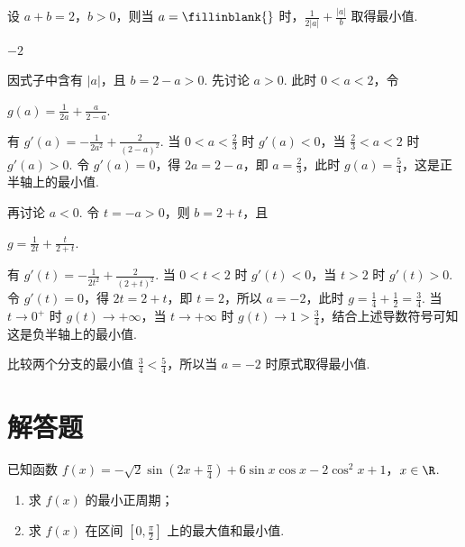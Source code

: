\begin{problem}
设 \(a + b = 2\)，\(b > 0\)，则当 \(a =\fillinblank{}\) 时，\(\frac{1}{2|a|} + \frac{|a|}{b}\) 取得最小值.
\end{problem}

\begin{answer}
\(-2\)
\end{answer}

\begin{solution}
因式子中含有 \(|a|\)，且 \(b=2-a>0\). 先讨论 \(a>0\). 此时 \(0<a<2\)，令

\(g(a)=\frac{1}{2a}+\frac{a}{2-a}\).

有 \(g'(a)=-\frac{1}{2a^2}+\frac{2}{(2-a)^2}\). 当 \(0<a<\frac{2}{3}\) 时 \(g'(a)<0\)，当 \(\frac{2}{3}<a<2\) 时 \(g'(a)>0\). 令 \(g'(a)=0\)，得 \(2a=2-a\)，即 \(a=\frac{2}{3}\)，此时 \(g(a)=\frac{5}{4}\)，这是正半轴上的最小值.

再讨论 \(a<0\). 令 \(t=-a>0\)，则 \(b=2+t\)，且

\(g=\frac{1}{2t}+\frac{t}{2+t}\).

有 \(g'(t)=-\frac{1}{2t^2}+\frac{2}{(2+t)^2}\). 当 \(0<t<2\) 时 \(g'(t)<0\)，当 \(t>2\) 时 \(g'(t)>0\). 令 \(g'(t)=0\)，得 \(2t=2+t\)，即 \(t=2\)，所以 \(a=-2\)，此时 \(g=\frac{1}{4}+\frac{1}{2}=\frac{3}{4}\). 当 \(t\to0^+\) 时 \(g(t)\to+\infty\)，当 \(t\to+\infty\) 时 \(g(t)\to1>\frac{3}{4}\)，结合上述导数符号可知这是负半轴上的最小值.

比较两个分支的最小值 \(\frac{3}{4}<\frac{5}{4}\)，所以当 \(a=-2\) 时原式取得最小值.
\end{solution}

\section{解答题}

\begin{problem}
已知函数 \(f(x) = -\sqrt{2} \sin \left(2x + \frac{\pi}{4}\right) + 6 \sin x \cos x - 2 \cos^2 x + 1\)，\(x \in \R\).
\begin{enumerate}
\item 求 \( f(x) \) 的最小正周期；
\item 求 \( f(x) \) 在区间 \([0, \frac{\pi}{2}]\) 上的最大值和最小值.
\end{enumerate}
\end{problem}

